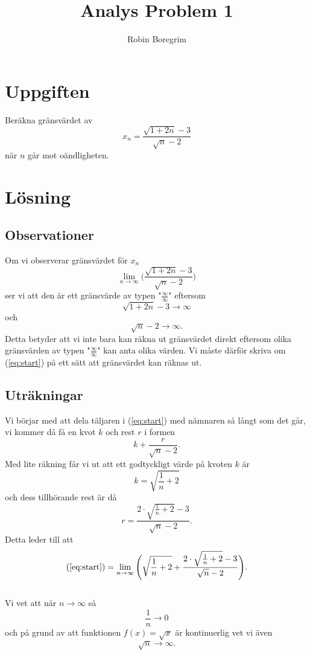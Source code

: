 \documentclass[11pt]{article}
\begin{document}
\title{Analys Problem 1}
\author{Robin Boregrim}
\maketitle
\renewcommand{\contentsname}{Innehållsförteckning}
\tableofcontents
\newpage
\section{Uppgiften}
Beräkna gränsvärdet av 
$$x_n = \frac{\sqrt{1+2n}-3}{\sqrt{n}-2}$$
när $n$ går mot oändligheten.
\section{Lösning}
\subsection{Observationer}
Om vi observerar gränsvärdet för $x_n$
\begin{equation} \label{eq:start}
\lim_{n\rightarrow \infty} \Bigg(\frac{\sqrt{1+2n}-3}{\sqrt{n}-2} \Bigg)
\end{equation}
ser vi att den är ett gränsvärde av typen "$\frac{\infty}{\infty}$" eftersom
$$\sqrt{1+2n}-3 \rightarrow \infty$$
och 
$$\sqrt{n}-2 \rightarrow \infty.$$
Detta betyder att vi inte bara kan räkna ut gränsvärdet direkt eftersom olika gränsvärden av typen "$\frac{\infty}{\infty}$" kan anta olika värden. Vi måste därför skriva om (\ref{eq:start}) på ett sätt att gränsvärdet kan räknas ut.
\subsection{Uträkningar}
Vi börjar med att dela täljaren i (\ref{eq:start}) med nämnaren så långt som det går, vi kommer då få en kvot $k$ och rest $r$ i formen$$k + \frac{r}{\sqrt{n} -2}.$$\newpage
Med lite räkning får vi ut att ett godtyckligt värde på kvoten $k$ är
$$k = \sqrt{\frac{1}{n} + 2}$$ och dess tillhörande rest är då
$$r = \frac{2\cdot\sqrt{\frac{1}{n} + 2} -3}{\sqrt{n}-2}.$$
Detta leder till att
$$(\ref{eq:start}) = \lim_{n\rightarrow \infty} \Bigg( \sqrt{\frac{1}{n} + 2} + \frac{2\cdot\sqrt{\frac{1}{n} + 2} -3}{\sqrt{n}-2}\Bigg).$$\\


Vi vet att när $n \rightarrow \infty$ så
\begin{equation} \label{eq:zero}
\frac{1}{n} \rightarrow 0
\end{equation}
och på grund av att funktionen $f(x) = \sqrt{x}$ är kontinuerlig vet vi även
\begin{equation} \label{eq:inf}
\sqrt{n} \rightarrow \infty.
\end{equation}
\end{document}
